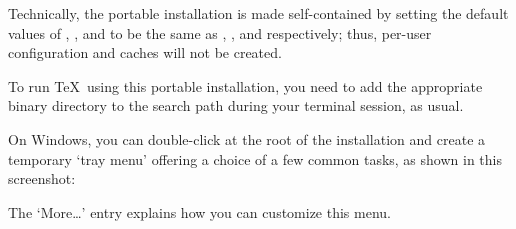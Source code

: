\documentclass{article}
\begin{document}
Technically, the portable installation is made self-contained by setting
the default values of , , and
 to be the same as ,
, and  respectively; thus,
per-user configuration and caches will not be created.

To run \TeX\ using this portable installation, you need to add the
appropriate binary directory to the search path during your terminal
session, as usual.

On Windows, you can double-click  at the root
of the installation and create a temporary `tray menu' offering a
choice of a few common tasks, as shown in this screenshot:

\medskip
{}
\smallskip

\noindent The `More\ldots' entry explains how you can customize this menu.
\end{document}
